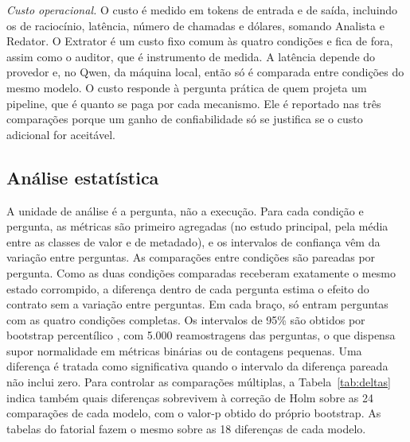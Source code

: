 \emph{Custo operacional.}
O custo é medido em tokens de entrada e de saída, incluindo os de raciocínio, latência, número de chamadas e dólares, somando Analista e Redator.
O Extrator é um custo fixo comum às quatro condições e fica de fora, assim como o auditor, que é instrumento de medida.
A latência depende do provedor e, no Qwen, da máquina local, então só é comparada entre condições do mesmo modelo.
O custo responde à pergunta prática de quem projeta um pipeline, que é quanto se paga por cada mecanismo. Ele é reportado nas três comparações porque um ganho de confiabilidade só se justifica se o custo adicional for aceitável.

\subsection{Análise estatística}\label{sec:estatistica}

A unidade de análise é a pergunta, não a execução.
Para cada condição e pergunta, as métricas são primeiro agregadas (no estudo principal, pela média entre as classes de valor e de metadado), e os intervalos de confiança vêm da variação entre perguntas.
As comparações entre condições são pareadas por pergunta. Como as duas condições comparadas receberam exatamente o mesmo estado corrompido, a diferença dentro de cada pergunta estima o efeito do contrato sem a variação entre perguntas.
Em cada braço, só entram perguntas com as quatro condições completas.
Os intervalos de 95\% são obtidos por bootstrap percentílico \cite{efron1993bootstrap}, com 5.000 reamostragens das perguntas, o que dispensa supor normalidade em métricas binárias ou de contagens pequenas.
Uma diferença é tratada como significativa quando o intervalo da diferença pareada não inclui zero.
Para controlar as comparações múltiplas, a Tabela~\ref{tab:deltas} indica também quais diferenças sobrevivem à correção de Holm \cite{holm1979simple} sobre as 24 comparações de cada modelo, com o valor-p obtido do próprio bootstrap. As tabelas do fatorial fazem o mesmo sobre as 18 diferenças de cada modelo.
